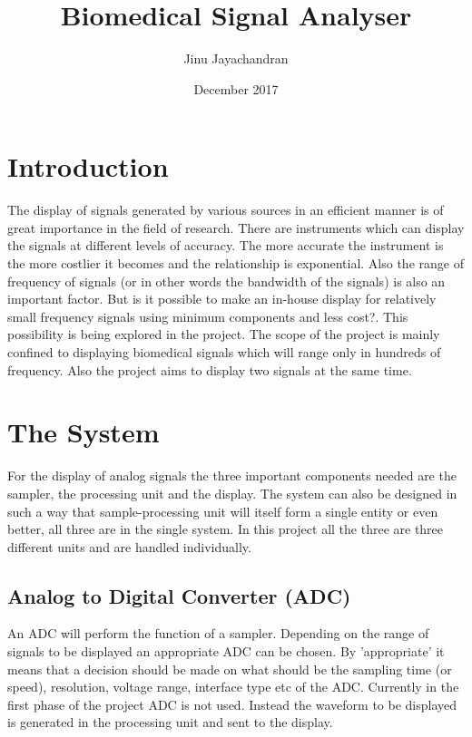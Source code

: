 \documentclass[12pt, a4paper, twoside]{article}
\title{Biomedical Signal Analyser}
\author{Jinu Jayachandran}
\date{December 2017}
\begin{document}
 
\begin{titlepage}
\maketitle
\end{titlepage}
\tableofcontents
\listoffigures
\section{Introduction}
    The display of signals generated by various sources in an efficient manner is of great importance in the field of research. There are instruments which can display the signals at different levels of accuracy. The more accurate the instrument is the more costlier it becomes and the relationship is exponential. Also the range of frequency of signals (or in other words the bandwidth of the signals) is also an important factor. But is it possible to make an in-house display for relatively small frequency signals using minimum components and less cost?. This possibility is being explored in the project. The scope of the project is mainly confined to displaying biomedical signals which will range only in hundreds of frequency. Also the project aims to display two signals at the same time.
    
\section{The System}
    For the display of analog signals the three important components needed are the sampler, the processing unit and the display. The system can also be designed in such a way that sample-processing unit will itself form a single entity or even better, all three are in the single system. In this project all the three are three different units and are handled individually. 

\subsection{Analog to Digital Converter (ADC)}
    An ADC will perform the function of a sampler. Depending on the range of signals to be displayed an appropriate ADC can be chosen. By 'appropriate' it means that a decision should be made on what should be the sampling time (or speed), resolution, voltage range, interface type etc of the ADC. Currently in the first phase of the project ADC is not used. Instead the waveform to be displayed is generated in the processing unit and sent to the display.
\end{document}
